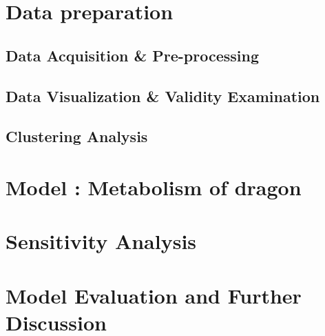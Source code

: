 \documentclass[12pt]{article}  %
\begin{document}
\newpage

\section{Data preparation}
\vspace{-0.5cm}
\subsection{Data Acquisition \& Pre-processing}
\vspace{-0.3cm}
\subsection{Data Visualization \& Validity Examination}
\vspace{-0.3cm}
\subsection{Clustering Analysis}
\vspace{-0.3cm}

\newpage


\section{Model \uppercase\expandafter{} : Metabolism of dragon}
\vspace{-0.3cm}





\newpage
\section{Sensitivity Analysis}
\vspace{-0.5cm}

\newpage
\section{Model Evaluation and Further Discussion}
\vspace{-0.5cm}
\end{document}
